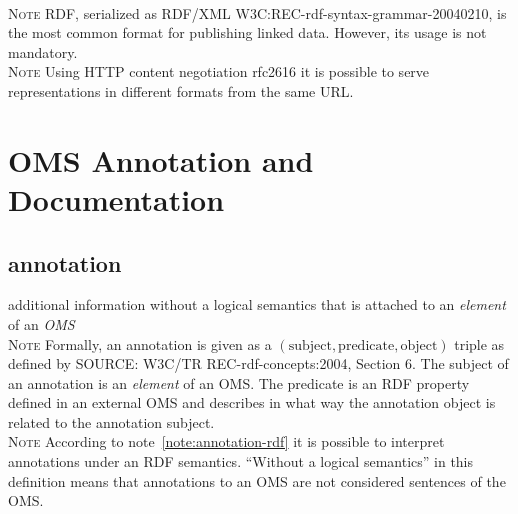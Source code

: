 \documentclass[10pt,%
\ifpretendfinal
final%
\else
draft%
\fi,
]{scrreprt}
\newcommand*{\termref}[1]{\textit{#1}}
\newcommand{\bref}[1]{[\ref{#1}]}
\newcommand{\sclause}[1]{\section{#1}}
\newcommand{\termdefinition}[2]{\subsection*{#1}#2}
\newcommand{\nisref}[1]{#1}
\renewcommand{\bref}[1]{#1}
\newenvironment{definitions}[0]{\medskip }{}
\newenvironment{note}[0]{\ \\ \textsc{Note} \quad}{}
\begin{document}
\begin{definitions}
  \begin{note}
    RDF, serialized as RDF/XML \bref{W3C:REC-rdf-syntax-grammar-20040210}, is the most common format for publishing linked data.  However, its usage is not mandatory.
  \end{note}
  \begin{note}
    Using HTTP content negotiation \bref{rfc2616} it is possible to serve representations in different formats from the same URL.
  \end{note}
\end{definitions}

\sclause{OMS Annotation and Documentation}\label{c:terms-annotation}
 
\begin{definitions}
  \termdefinition{annotation}{additional information without a logical semantics that is attached to an \termref{element} of an \termref{OMS}}
  \begin{note}\label{note:annotation-rdf}
    Formally, an annotation is given as a $(\text{subject}, \text{predicate}, \text{object})$ triple as defined by \nisref{SOURCE: W3C/TR REC-rdf-concepts:2004, Section 6}.  The subject of an annotation is an \termref{element} of an OMS.  The predicate is an RDF property defined in an external OMS and describes in what way the annotation object is related to the annotation subject.
  \end{note}
  \begin{note}
    According to note~\ref{note:annotation-rdf} it is possible to interpret annotations under an RDF semantics.  ``Without a logical semantics'' in this definition means that annotations to an OMS are not considered sentences of the OMS.
  \end{note}

  

\end{definitions}
\end{document}

